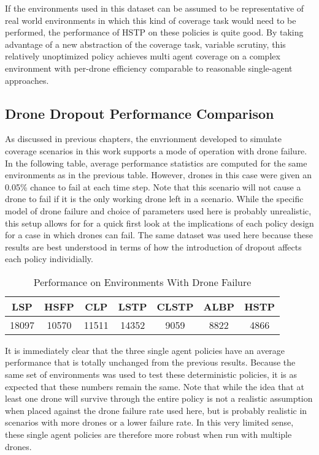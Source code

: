 If the environments used in this dataset can be assumed to be representative of real world environments in which this kind of coverage task would need to be performed, the performance of HSTP on these policies is quite good. By taking advantage of a new abstraction of the coverage task, variable scrutiny, this relatively unoptimized policy achieves multi agent coverage on a complex environment with per-drone efficiency comparable to reasonable single-agent approaches.

\subsection{Drone Dropout Performance Comparison}

As discussed in previous chapters, the envrionment developed to simulate coverage scenarios in this work supports a mode of operation with drone failure. In the following table, average performance statistics are computed for the same environments as in the previous table. However, drones in this case were given an 0.05\% chance to fail at each time step. Note that this scenario will not cause a drone to fail if it is the only working drone left in a scenario. While the specific model of drone failure and choice of parameters used here is probably unrealistic, this setup allows for for a quick first look at the implications of each policy design for a case in which drones can fail. The same dataset was used here because these results are best understood in terms of how the introduction of dropout affects each policy individially.

\begin{table}[h]
\begin{center}
 \begin{tabular}{||c c c c c c c ||}
 \hline
 LSP   & HSFP  & CLP   & LSTP  & CLSTP & ALBP & HSTP \\
 \hline
 18097 & 10570 & 11511 & 14352 & 9059  & 8822 & 4866 \\
 \hline
 \end{tabular}
\end{center}
\caption{Performance on Environments With Drone Failure}
\end{table}

It is immediately clear that the three single agent policies have an average performance that is totally unchanged from the previous results. Because the same set of environments was used to test these deterministic policies, it is as expected that these numbers remain the same. Note that while the idea that at least one drone will survive through the entire policy is not a realistic assumption when placed against the drone failure rate used here, but is probably realistic in scenarios with more drones or a lower failure rate. In this very limited sense, these single agent policies are therefore more robust when run with multiple drones.

